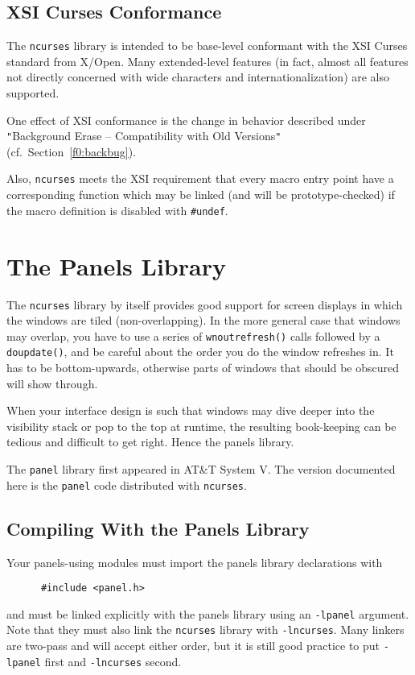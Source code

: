 \section{XSI Curses Conformance}

\label{f0:xsifuncs}The \texttt{ncurses} library is intended to be base-level conformant with the
XSI Curses standard from X/Open.  Many extended-level features (in fact, almost
all features not directly concerned with wide characters and
internationalization) are also supported. 

One effect of XSI conformance is the change in behavior described under
{\tt{}"{}}Background Erase -- Compatibility with Old Versions{\tt{}"{}} (cf.\ Section~\ref{f0:backbug}). 

Also, \texttt{ncurses} meets the XSI requirement that every macro
entry point have a corresponding function which may be linked (and
will be prototype-checked) if the macro definition is disabled with
\texttt{\#undef}.

\chapter{The Panels Library}

\label{f0:panels}The \texttt{ncurses} library by itself provides good support for screen
displays in which the windows are tiled (non-overlapping).  In the more
general case that windows may overlap, you have to use a series of
\texttt{wnoutrefresh()} calls followed by a \texttt{doupdate()}, and be
careful about the order you do the window refreshes in.  It has to be
bottom-upwards, otherwise parts of windows that should be obscured will
show through. 

When your interface design is such that windows may dive deeper into the
visibility stack or pop to the top at runtime, the resulting book-keeping
can be tedious and difficult to get right.  Hence the panels library. 

The \texttt{panel} library first appeared in AT\&T System V.  The
version documented here is the \texttt{panel} code distributed
with \texttt{ncurses}.

\section{Compiling With the Panels Library}

\label{f0:pcompile}Your panels-using modules must import the panels library declarations with
\begin{verbatim} 	  #include <panel.h>
\end{verbatim}
and must be linked explicitly with the panels library using an
\texttt{-lpanel} argument.  Note that they must also link the
\texttt{ncurses} library with \texttt{-lncurses}.  Many linkers
are two-pass and will accept either order, but it is still good practice
to put \texttt{-lpanel} first and \texttt{-lncurses} second.

